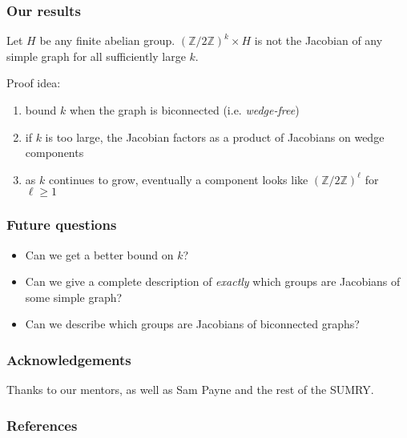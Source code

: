 \documentclass{beamer}
\newcommand{\Z}{\ensuremath{\mathbb{Z}}}
\begin{document}
\begin{frame}
  \frametitle{Our results}
  \begin{theorem}
    Let $H$ be any finite abelian group.  $(\Z/2\Z)^k \times H$ is not
    the Jacobian of any simple graph for all sufficiently large $k$.
  \end{theorem}

  \pause 

  Proof idea: 
  \begin{enumerate}
  \item bound $k$ when the graph is biconnected
    (i.e. \emph{wedge-free})
    \pause
  \item if $k$ is too large, the Jacobian factors as a product of
    Jacobians on wedge components
    \pause
  \item as $k$ continues to grow, eventually a component looks like
    $(\Z/2\Z)^\ell$ for $\ell \ge 1$
  \end{enumerate}

\end{frame}

\begin{frame}
  \frametitle{Future questions}
  \begin{itemize}
    \item Can we get a better bound on $k$?
      \pause
    \item Can we give a complete description of \emph{exactly} which
      groups are Jacobians of some simple graph?
      \pause
    \item Can we describe which groups are Jacobians of biconnected
      graphs?
  \end{itemize}
\end{frame}

\begin{frame}
  \frametitle{Acknowledgements}

  Thanks to our mentors, as well as Sam Payne and the rest of the
  SUMRY.
  
\end{frame}

\begin{frame}
  \frametitle{References}
\end{frame}
\end{document}
